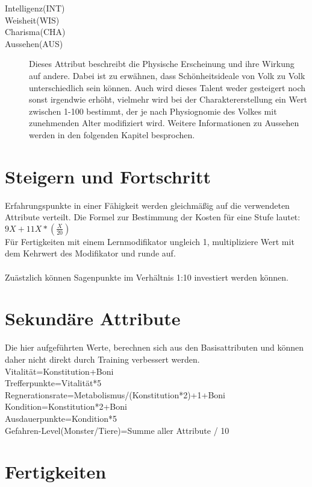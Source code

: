 \documentclass[a4paper,12pt,oneside]{book}
\begin{document}
\begin{description}
\item[Intelligenz(INT)]
\item[Weisheit(WIS)]
\item[Charisma(CHA)]
\item[Aussehen(AUS)]
Dieses Attribut beschreibt die Physische Erscheinung und ihre Wirkung auf andere. Dabei ist zu erwähnen, dass Schönheitsideale von Volk zu Volk unterschiedlich sein können. Auch wird dieses Talent weder gesteigert noch sonst irgendwie erhöht, vielmehr wird bei der Charaktererstellung ein Wert zwischen 1-100 bestimmt, der je nach Physiognomie des Volkes mit zunehmenden Alter modifiziert wird. Weitere Informationen zu Aussehen werden in den folgenden Kapitel besprochen.
\end{description}
\chapter{Steigern und Fortschritt}
Erfahrungspunkte in einer Fähigkeit werden gleichmäßig auf die verwendeten Attribute verteilt. Die Formel zur Bestimmung der Kosten für eine Stufe lautet:
\\$9X+11X*(\frac{X}{20})$
\\Für Fertigkeiten mit einem Lernmodifikator ungleich 1, multipliziere Wert mit dem Kehrwert des Modifikator und runde auf.
\\
\\Zuästzlich können Sagenpunkte im Verhältnis 1:10 investiert werden können.
\chapter{Sekundäre Attribute}
Die hier aufgeführten Werte, berechnen sich aus den Basisattributen und können daher nicht direkt durch Training verbessert werden.
\\Vitalität=Konstitution+Boni
\\Trefferpunkte=Vitalität*5
\\Regnerationsrate=Metabolismus/(Konstitution*2)+1+Boni
\\Kondition=Konstitution*2+Boni
\\Ausdauerpunkte=Kondition*5
\\Gefahren-Level(Monster/Tiere)=Summe aller Attribute / 10
\chapter{Fertigkeiten}
\end{document}
